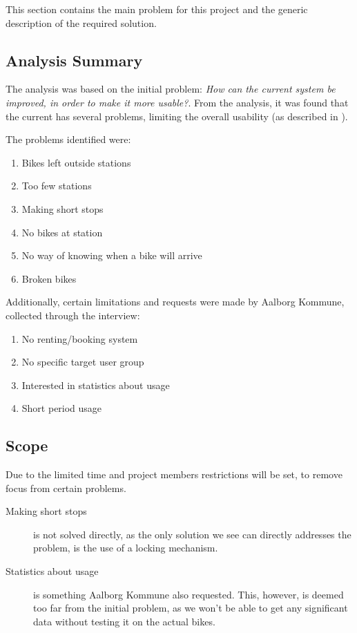 This section contains the main problem for this project and the generic description of the required solution.

\subsection{Analysis Summary}
The analysis was based on the initial problem: \textit{How can the current \citybike system be improved, in order to make it more usable?}.
From the analysis, it was found that the current \citybike has several problems, limiting the overall usability (as described in ).

The problems identified were:
\begin{enumerate}
\item Bikes left outside stations \label{pr_stations}
\item Too few stations \label{pr_few}
\item Making short stops \label{pr_stops}
\item No bikes at station \label{pr_nobikes}
\item No way of knowing when a bike will arrive \label{pr_arrive}
\item Broken bikes \label{pr_broken}
\end{enumerate}

Additionally, certain limitations and requests were made by Aalborg Kommune, collected through the interview:

\begin{enumerate}
\item No renting/booking system
\item No specific target user group
\item Interested in statistics about usage \label{pr_stats}
\item Short period usage
\end{enumerate}

\subsection{Scope}
Due to the limited time and project members restrictions will be set, to remove focus from certain problems.

\begin{description}
\item[Making short stops] is not solved directly, as the only solution we see can directly addresses the problem, is the use of a locking mechanism.

\item[Statistics about usage] is something Aalborg Kommune also requested.
This, however, is deemed too far from the initial problem, as we won't be able to get any significant data without testing it on the actual bikes.
\end{description}

